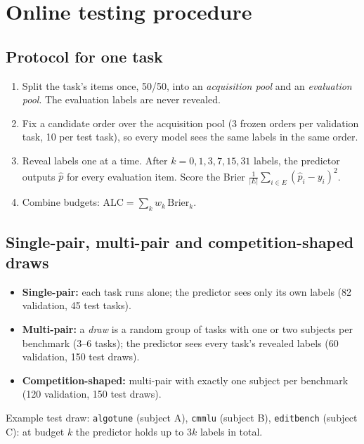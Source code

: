 \documentclass[10pt]{article}
\newcommand{\code}[1]{\texttt{#1}}
\begin{document}
\section{Online testing procedure}

\subsection{Protocol for one task}
\begin{enumerate}[nosep]
\item Split the task's items once, 50/50, into an \emph{acquisition pool} and an \emph{evaluation pool}. The evaluation labels are never revealed.
\item Fix a candidate order over the acquisition pool (3 frozen orders per validation task, 10 per test task), so every model sees the same labels in the same order.
\item Reveal labels one at a time. After $k=0,1,3,7,15,31$ labels, the predictor outputs $\hat p$ for every evaluation item. Score the Brier $\frac1{|E|}\sum_{i\in E}(\hat p_i-y_i)^2$.
\item Combine budgets: $\mathrm{ALC}=\sum_k w_k\,\mathrm{Brier}_k$.
\end{enumerate}

\subsection{Single-pair, multi-pair and competition-shaped draws}
\begin{itemize}[nosep]
\item \textbf{Single-pair:} each task runs alone; the predictor sees only its own labels (82 validation, 45 test tasks).
\item \textbf{Multi-pair:} a \emph{draw} is a random group of tasks with one or two subjects per benchmark (3--6 tasks); the predictor sees every task's revealed labels (60 validation, 150 test draws).
\item \textbf{Competition-shaped:} multi-pair with exactly one subject per benchmark (120 validation, 150 test draws).
\end{itemize}
Example test draw: \code{algotune} (subject A), \code{cmmlu} (subject B), \code{editbench} (subject C): at budget $k$ the predictor holds up to $3k$ labels in total.
\end{document}
